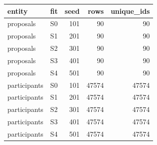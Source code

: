 \begin{tabular}{llrrr}
\toprule
entity & fit & seed & rows & unique\_ids \\
\midrule
proposals & S0 & 101 & 90 & 90 \\
proposals & S1 & 201 & 90 & 90 \\
proposals & S2 & 301 & 90 & 90 \\
proposals & S3 & 401 & 90 & 90 \\
proposals & S4 & 501 & 90 & 90 \\
participants & S0 & 101 & 47574 & 47574 \\
participants & S1 & 201 & 47574 & 47574 \\
participants & S2 & 301 & 47574 & 47574 \\
participants & S3 & 401 & 47574 & 47574 \\
participants & S4 & 501 & 47574 & 47574 \\
\bottomrule
\end{tabular}
